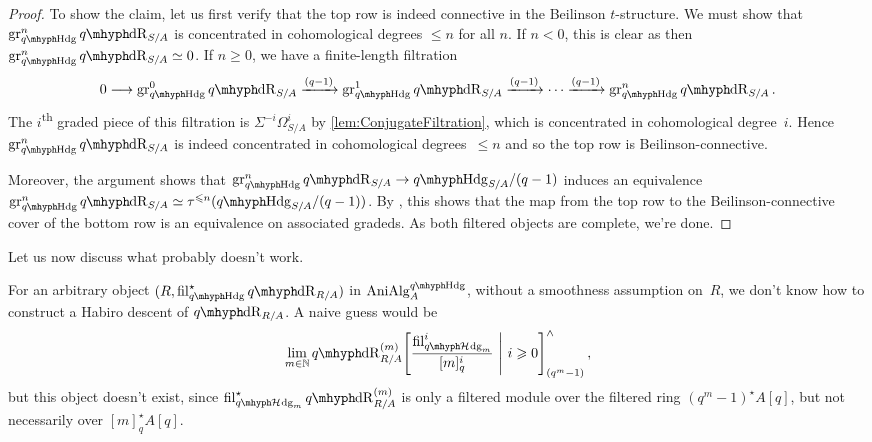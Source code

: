 \documentclass[DIV=12,numbers=enddot,leqno,bibliography=totoc]{scrartcl}
\begin{document}
\begin{proof}
		To show the claim, let us first verify that the top row is indeed connective in the Beilinson $t$-structure. We must show that $\gr_{\qHodge}^n\qdeRham_{S/A}$ is concentrated in cohomological degrees $\leqslant n$ for all $n$. If $n<0$, this is clear as then $\gr_{\qHodge}^n\qdeRham_{S/A}\simeq 0$. If $n\geqslant 0$, we have a finite-length filtration
		\begin{equation*}
			0\longrightarrow \gr^0_{\qHodge}\qdeRham_{S/A}\xrightarrow{(q-1)}\gr^1_{\qHodge}\qdeRham_{S/A}\xrightarrow{(q-1)}\dotsb \xrightarrow{(q-1)}\gr^n_{\qHodge}\qdeRham_{S/A}\,.
		\end{equation*}
		The $i$\textsuperscript{th} graded piece of this filtration is $\Sigma^{-i}\Omega_{S/A}^i$ by \cref{lem:ConjugateFiltration}, which is concentrated in cohomological degree~$i$. Hence $\gr_{\qHodge}^n\qdeRham_{S/A}$ is indeed concentrated in cohomological degrees~$\leqslant n$ and so the top row is Beilinson-connective.
		
		Moreover, the argument shows that $\gr_{\qHodge}^n\qdeRham_{S/A}\rightarrow \qHodge_{S/A}/(q-1)$ induces an equivalence $\gr_{\qHodge}^n\qdeRham_{S/A}\simeq \tau^{\leqslant n}(\qHodge_{S/A}/(q-1))$. By \cite[Theorem~(2)]{BMS2}, this shows that the map from the top row to the Beilinson-connective cover of the bottom row is an equivalence on associated gradeds. As both filtered objects are complete, we're done.
	\end{proof}
	Let us now discuss what probably doesn't work.
	
	\begin{rem}
		For an arbitrary object $(R,\fil_{\qHodge}^\star \qdeRham_{R/A})$ in $\cat{AniAlg}_A^{\qHodge}$, without a smoothness assumption on~$R$, we don't know how to construct a Habiro descent of $\qdeRham_{R/A}$. A naive guess would be
		\begin{equation*}
			\limit_{m\in\IN}\qdeRham_{R/A}^{(m)}\left[\frac{ \fil_{\qHhodge_m}^i}{[m]_q^i}\ \middle|\ i\geqslant 0\right]_{(q^m-1)}^\complete\,,
		\end{equation*}
		but this object doesn't exist, since $ \fil_{\qHhodge_m}^\star\qdeRham_{R/A}^{(m)}$ is only a filtered module over the filtered ring $(q^m-1)^\star A[q]$, but not necessarily over $[m]_q^\star A[q]$.
	\end{rem}
	
\end{document}
